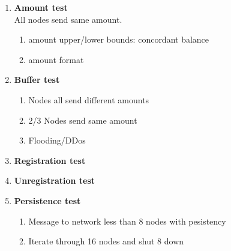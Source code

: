 \documentclass[]{article}
\begin{document}
					\begin{enumerate}
					\item \textbf{Amount test}\\
					All nodes send same amount.
						\begin{enumerate}
						\item amount upper/lower bounds: concordant balance
						\item amount format  
						\end{enumerate}
					\item \textbf{Buffer test}\\
					\begin{enumerate}
						\item Nodes all send different amounts 
						\item 2/3 Nodes send same amount
						\item Flooding/DDos  
					\end{enumerate}
						\item \textbf{Registration test}\\
						\item \textbf{Unregistration test}\\
						\item \textbf{Persistence test}\\
							\begin{enumerate}
								\item Message to network less than 8 nodes with pesistency
								\item Iterate through 16 nodes and shut 8 down
							\end{enumerate}
				\end{enumerate}
	
\end{document}
